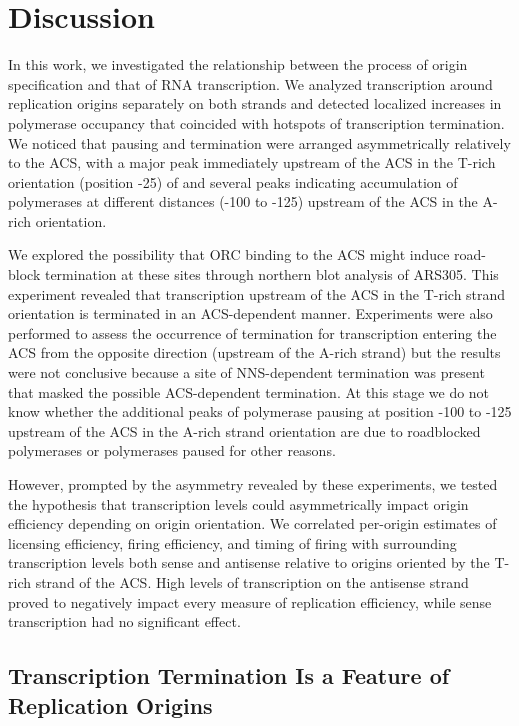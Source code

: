 \clearpage

\section{Discussion} \label{repDisc}

In this work, we investigated the relationship between the process of origin specification and that of RNA transcription. We analyzed transcription around replication origins separately on both strands and detected localized increases in polymerase occupancy that coincided with hotspots of transcription termination. We noticed that pausing and termination were arranged asymmetrically relatively to the ACS, with a major peak immediately upstream of the ACS in the T-rich orientation (position -25) of and several peaks indicating accumulation of polymerases at different distances (-100 to -125) upstream of the ACS in the  A-rich  orientation.

We explored the possibility that ORC binding to the ACS might induce road-block termination at these sites through northern blot analysis of ARS305. This experiment revealed that transcription upstream of the ACS in the T-rich strand orientation is terminated in an ACS-dependent manner. Experiments were also performed to assess the occurrence of termination for transcription entering the ACS from the opposite direction (upstream of the A-rich strand) but the results were not conclusive because a site of NNS-dependent termination was present that masked the possible ACS-dependent termination. At this stage we do not know whether the additional peaks of polymerase pausing at position -100 to -125 upstream of the ACS in the A-rich strand orientation are due to roadblocked polymerases or polymerases paused for other reasons.  

However, prompted by the asymmetry revealed by these experiments, we tested the hypothesis that transcription levels could asymmetrically impact origin efficiency depending on origin orientation. We correlated per-origin estimates of licensing efficiency, firing efficiency, and timing of firing with surrounding transcription levels both sense and antisense relative to origins oriented by the T-rich strand of the ACS. High levels of transcription on the antisense strand proved to negatively impact every measure of replication efficiency, while sense transcription had no significant effect.

\singlespacing
\subsection{Transcription Termination Is a Feature of Replication Origins}
\doublespacing

